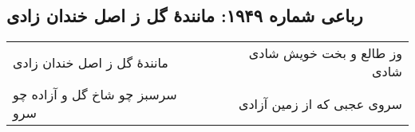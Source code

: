 \begin{center}
\section*{رباعی شماره ۱۹۴۹: مانندهٔ گل ز اصل خندان زادی}
\label{sec:1949}
\begin{longtable}{l p{0.5cm} r}
مانندهٔ گل ز اصل خندان زادی
&&
وز طالع و بخت خویش شادی شادی
\\
سرسبز چو شاخ گل و آزاده چو سرو
&&
سروی عجبی که از زمین آزادی
\\
\end{longtable}
\end{center}
